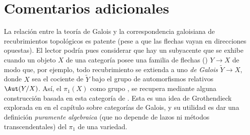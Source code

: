 \documentclass[11pt, reqno]{amsart}
\begin{document}
\section*{Comentarios adicionales}
La relación entre la teoría de Galois y la correspondencia galoisiana de recubrimientos topológicos es patente (pese a que las flechas vayan
en direcciones opuestas).
El lector podría pues considerar que hay un  subyacente que se exhibe cuando un objeto $X$ de una categoría posee
una familia de flechas () $Y \to X$ de modo que, por ejemplo, todo recubrimiento se extienda a uno \emph{de
Galois} $\tilde Y \to X$, donde $X$ sea el cociente de $\tilde Y$ bajo el grupo de automorfismos relativos $\Aut(Y/X)$.
Así, el $\pi_1(X)$ como grupo , se recupera mediante alguna construcción basada en esta categoría de
.
Esta es una idea de Grothendieck explorada en \cite{sga-1} en el capítulo sobre categorías de Galois, y su utilidad es dar una definición
\emph{puramente algebraica} (que no depende de lazos ni métodos transcendentales) del $\pi_1$ de una variedad.\footnotemark{}

\printbibliography
\end{document}
